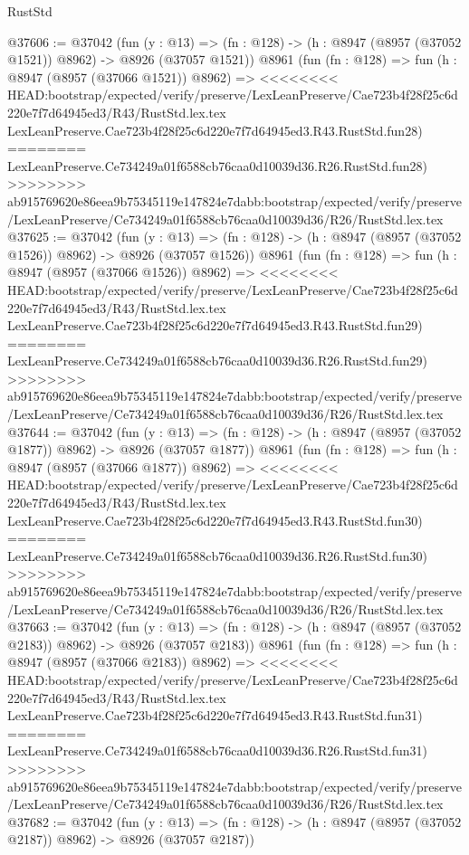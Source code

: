 \begin{lexlean}{RustStd}
\begin{coremodule}
{\begin{coremodule}
{{{{{{{{{{{{{{{{{{{{{{{{{{{{{{{{{{{{{{{@37606 := @37042
    (fun (y : @13) =>
    (fn : @128) -> (h : @8947 (@8957 (@37052 @1521)) @8962) -> @8926 (@37057 @1521))
    @8961
    (fun (fn : @128) =>
    fun (h : @8947 (@8957 (@37066 @1521)) @8962) =>
<<<<<<<< HEAD:bootstrap/expected/verify/preserve/LexLeanPreserve/Cae723b4f28f25c6d220e7f7d64945ed3/R43/RustStd.lex.tex
    LexLeanPreserve.Cae723b4f28f25c6d220e7f7d64945ed3.R43.RustStd.fun28)
========
    LexLeanPreserve.Ce734249a01f6588cb76caa0d10039d36.R26.RustStd.fun28)
>>>>>>>> ab915769620e86eea9b75345119e147824e7dabb:bootstrap/expected/verify/preserve/LexLeanPreserve/Ce734249a01f6588cb76caa0d10039d36/R26/RustStd.lex.tex
@37625 := @37042
    (fun (y : @13) =>
    (fn : @128) -> (h : @8947 (@8957 (@37052 @1526)) @8962) -> @8926 (@37057 @1526))
    @8961
    (fun (fn : @128) =>
    fun (h : @8947 (@8957 (@37066 @1526)) @8962) =>
<<<<<<<< HEAD:bootstrap/expected/verify/preserve/LexLeanPreserve/Cae723b4f28f25c6d220e7f7d64945ed3/R43/RustStd.lex.tex
    LexLeanPreserve.Cae723b4f28f25c6d220e7f7d64945ed3.R43.RustStd.fun29)
========
    LexLeanPreserve.Ce734249a01f6588cb76caa0d10039d36.R26.RustStd.fun29)
>>>>>>>> ab915769620e86eea9b75345119e147824e7dabb:bootstrap/expected/verify/preserve/LexLeanPreserve/Ce734249a01f6588cb76caa0d10039d36/R26/RustStd.lex.tex
@37644 := @37042
    (fun (y : @13) =>
    (fn : @128) -> (h : @8947 (@8957 (@37052 @1877)) @8962) -> @8926 (@37057 @1877))
    @8961
    (fun (fn : @128) =>
    fun (h : @8947 (@8957 (@37066 @1877)) @8962) =>
<<<<<<<< HEAD:bootstrap/expected/verify/preserve/LexLeanPreserve/Cae723b4f28f25c6d220e7f7d64945ed3/R43/RustStd.lex.tex
    LexLeanPreserve.Cae723b4f28f25c6d220e7f7d64945ed3.R43.RustStd.fun30)
========
    LexLeanPreserve.Ce734249a01f6588cb76caa0d10039d36.R26.RustStd.fun30)
>>>>>>>> ab915769620e86eea9b75345119e147824e7dabb:bootstrap/expected/verify/preserve/LexLeanPreserve/Ce734249a01f6588cb76caa0d10039d36/R26/RustStd.lex.tex
@37663 := @37042
    (fun (y : @13) =>
    (fn : @128) -> (h : @8947 (@8957 (@37052 @2183)) @8962) -> @8926 (@37057 @2183))
    @8961
    (fun (fn : @128) =>
    fun (h : @8947 (@8957 (@37066 @2183)) @8962) =>
<<<<<<<< HEAD:bootstrap/expected/verify/preserve/LexLeanPreserve/Cae723b4f28f25c6d220e7f7d64945ed3/R43/RustStd.lex.tex
    LexLeanPreserve.Cae723b4f28f25c6d220e7f7d64945ed3.R43.RustStd.fun31)
========
    LexLeanPreserve.Ce734249a01f6588cb76caa0d10039d36.R26.RustStd.fun31)
>>>>>>>> ab915769620e86eea9b75345119e147824e7dabb:bootstrap/expected/verify/preserve/LexLeanPreserve/Ce734249a01f6588cb76caa0d10039d36/R26/RustStd.lex.tex
@37682 := @37042
    (fun (y : @13) =>
    (fn : @128) -> (h : @8947 (@8957 (@37052 @2187)) @8962) -> @8926 (@37057 @2187))
}}}}}}}}}}}}}}}}}}}}}}}}}}}}}}}}}}}}}}}
\end{coremodule}}
\end{coremodule}
\end{lexlean}

